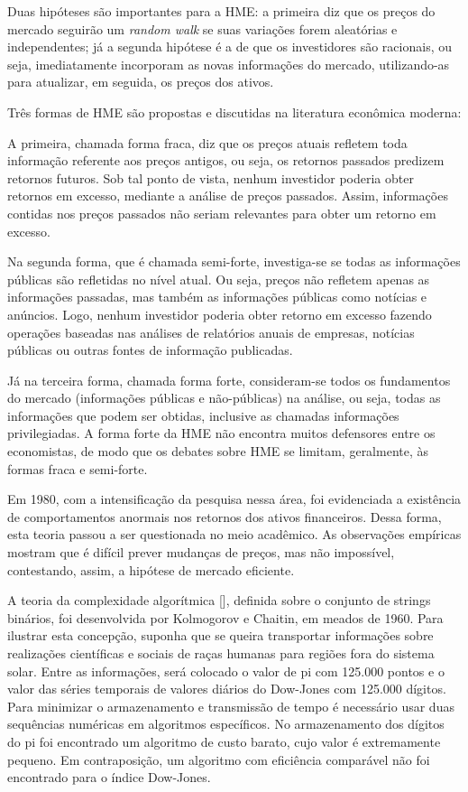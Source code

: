 \documentclass[brazil,ruledheader]{abnt}
\renewcommand{\cite}[1]{[\citeonline{#1}]}
\begin{document}
Duas hipóteses são importantes para a HME: a primeira diz que os preços
do mercado seguirão um \emph{random walk} se suas variações forem aleatórias
e independentes; já a segunda hipótese é a de que os investidores são racionais,
ou seja, imediatamente incorporam as novas informações do mercado,
utilizando-as para atualizar, em seguida, os preços dos ativos.

Três formas de HME são propostas e discutidas na literatura
econômica moderna:

A primeira, chamada forma fraca, diz que os preços atuais refletem
toda informação referente aos preços antigos, ou seja, os retornos
passados predizem retornos futuros. Sob tal ponto de vista, nenhum
investidor poderia obter retornos em excesso, mediante a análise de
preços passados. Assim, informações contidas nos preços passados não
seriam relevantes para obter um retorno em excesso.

Na segunda forma, que é chamada semi-forte, investiga-se se todas as
informações públicas são refletidas no nível atual. Ou seja, preços não
refletem apenas as informações passadas, mas também as informações públicas
como notícias e anúncios. Logo, nenhum investidor poderia obter retorno
em excesso fazendo operações baseadas nas análises de relatórios anuais
de empresas, notícias públicas ou outras fontes de informação publicadas.

Já na terceira forma, chamada forma forte, consideram-se todos os fundamentos
do mercado (informações públicas e não-públicas) na análise, ou seja, todas
as informações que podem ser obtidas, inclusive as chamadas
informações privilegiadas. A forma forte da HME não encontra muitos
defensores entre os economistas, de modo que os debates sobre HME se
limitam, geralmente, às formas fraca e semi-forte.

Em 1980, com a intensificação da pesquisa nessa área, foi evidenciada
a existência de comportamentos anormais nos retornos dos ativos
financeiros. Dessa forma, esta teoria passou a ser questionada no meio
acadêmico. As observações empíricas mostram que é difícil prever mudanças
de preços, mas não impossível, contestando, assim, a hipótese de
mercado eficiente.

A teoria da complexidade algorítmica \cite{MaSt00}, definida sobre o
conjunto de strings binários, foi desenvolvida por Kolmogorov e Chaitin, em
meados de 1960. Para  ilustrar esta concepção, suponha que se queira transportar
informações sobre realizações científicas e sociais de raças humanas para
regiões fora do sistema solar. Entre as informações, será colocado o valor de
pi com 125.000 pontos e o valor das séries temporais de valores diários
do Dow-Jones com 125.000 dígitos. Para minimizar o armazenamento e transmissão
de tempo é necessário usar duas sequências numéricas em algoritmos
específicos. No armazenamento dos dígitos do pi foi encontrado um algoritmo
de custo barato, cujo valor é extremamente pequeno. Em contraposição,
um algoritmo com eficiência comparável não foi encontrado para o
índice Dow-Jones.
\end{document}
